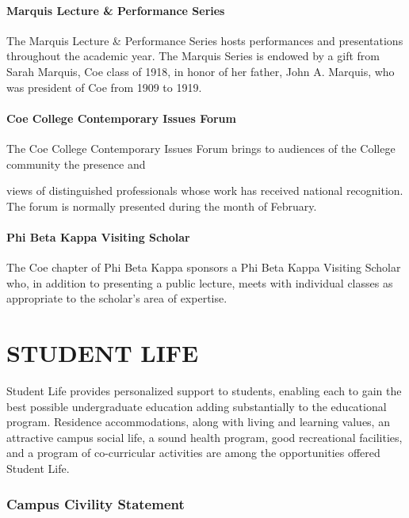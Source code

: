 \documentclass[
  letterpaper,
]{scrbook}
\begin{document}
\subsubsection{Marquis Lecture \& Performance
Series}\label{marquis-lecture-performance-series}

The Marquis Lecture \& Performance Series hosts performances and
presentations throughout the academic year. The Marquis Series is
endowed by a gift from Sarah Marquis, Coe class of 1918, in honor of her
father, John A. Marquis, who was president of Coe from 1909 to 1919.

\subsubsection{Coe College Contemporary Issues
Forum}\label{coe-college-contemporary-issues-forum}

The Coe College Contemporary Issues Forum brings to audiences of the
College community the presence and

views of distinguished professionals whose work has received national
recognition. The forum is normally presented during the month of
February.

\subsubsection{Phi Beta Kappa Visiting
Scholar}\label{phi-beta-kappa-visiting-scholar}

The Coe chapter of Phi Beta Kappa sponsors a Phi Beta Kappa Visiting
Scholar who, in addition to presenting a public lecture, meets with
individual classes as appropriate to the scholar's area of expertise.

\chapter{STUDENT LIFE}\label{student-life}

Student Life provides personalized support to students, enabling each to
gain the best possible undergraduate education adding substantially to
the educational program. Residence accommodations, along with living and
learning values, an attractive campus social life, a sound health
program, good recreational facilities, and a program of co-curricular
activities are among the opportunities offered Student Life.

\subsection{Campus Civility Statement}\label{campus-civility-statement}
\end{document}
